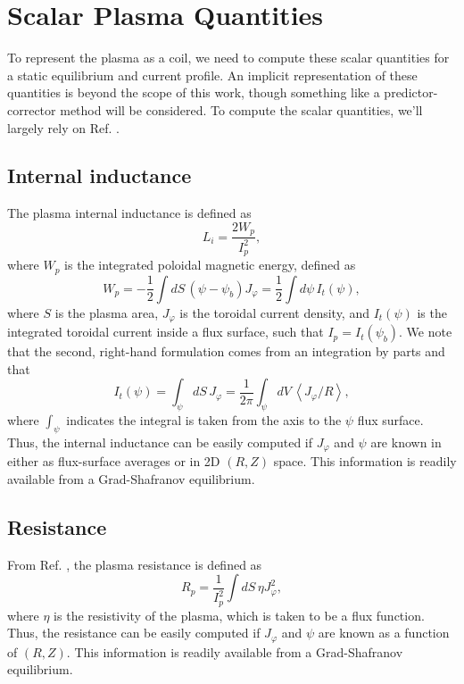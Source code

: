 \documentclass[reprint,onecolumn,amsmath,aip,pop,letterpaper, 11pt]{revtex4-1}
\newcommand{\Jt}{J_\varphi}
\newcommand{\fsa}[1]{\left\langle #1 \right\rangle}
\begin{document}
\section{Scalar Plasma Quantities}

To represent the plasma as a coil, we need to compute these scalar quantities for a static equilibrium and current profile. An implicit representation of these quantities is beyond the scope of this work, though something like a predictor-corrector method will be considered.  To compute the scalar quantities, we'll largely rely on Ref.  .

\subsection{Internal inductance}
\label{sec:Li}
The plasma internal inductance is defined as
\begin{equation}
L_i = \frac{2 W_p}{I_p^2}, \label{eq:Li}
\end{equation}
where $W_p$ is the integrated poloidal magnetic energy, defined as 
\begin{equation}
W_p = -\frac{1}{2} \int dS\, \left(\psi - \psi_b\right)\Jt = \frac{1}{2} \int d\psi\, I_t(\psi), \label{eq:Wp}
\end{equation}
where $S$ is the plasma area, $\Jt$ is the toroidal current density, and $I_t(\psi)$ is the integrated toroidal current inside a flux surface,  such that $I_p = I_t\left(\psi_b\right)$.  We note that the second, right-hand formulation comes from an integration by parts and that
\begin{equation}
I_t(\psi) = \int_\psi dS\, \Jt = \frac{1}{2\pi}\int_\psi dV\, \fsa{\Jt/R}, \label{eq:It}
\end{equation}
where $\int_\psi$ indicates the integral is taken from the axis to the $\psi$ flux surface. Thus,  the internal inductance can be easily computed if $\Jt$ and $\psi$ are known in either as flux-surface averages or in 2D $(R,Z)$ space. This information is readily available from a Grad-Shafranov equilibrium.

\subsection{Resistance}
\label{sec:Rp}
From Ref. , the plasma resistance is defined as
\begin{equation}
R_p = \frac{1}{I_p^2} \int dS\, \eta \Jt^2,\label{eq:Rp}
\end{equation}
where $\eta$ is the resistivity of the plasma, which is taken to be a flux function.  Thus,  the resistance can be easily computed if $\Jt$ and $\psi$ are known as a function of $(R,Z)$. This information is readily available from a Grad-Shafranov equilibrium.
\pagebreak
\end{document}
